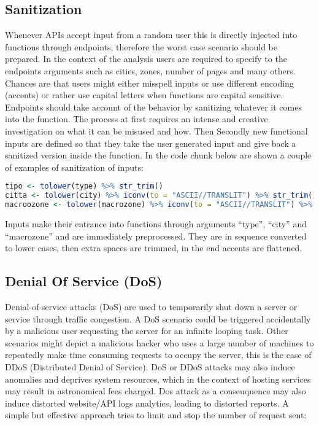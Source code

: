 \documentclass[
  12pt,
  a4paper,
  oneside]{book}
\theoremstyle{definition}
\theoremstyle{definition}
\theoremstyle{definition}
\theoremstyle{remark}
\begin{document}
\hypertarget{sanitize}{%
\subsection{Sanitization}\label{sanitize}}

Whenever APIs accept input from a random user this is directly injected into functions through endpoints, therefore the worst case scenario should be prepared. In the context of the analysis users are required to specify to the endpoints arguments such as cities, zones, number of pages and many others. Chances are that users might either misspell inputs or use different encoding (accents) or rather use capital letters when functions are capital sensitive. Endpoints should take account of the behavior by sanitizing whatever it comes into the function. The process at first requires an intense and creative investigation on what it can be misused and how. Then Secondly new functional inputs are defined so that they take the user generated input and give back a sanitized version inside the function. In the code chunk below are shown a couple of examples of sanitization of inputs:

\begin{lstlisting}[language=R]
tipo <- tolower(type) %>% str_trim()
citta <- tolower(city) %>% iconv(to = "ASCII//TRANSLIT") %>% str_trim()
macroozone <- tolower(macrozone) %>% iconv(to = "ASCII//TRANSLIT") %>% str_trim()
\end{lstlisting}

Inputs make their entrance into functions through arguments ``type'', ``city'' and ``macrozone'' and are immediately preprocessed. They are in sequence converted to lower cases, then extra spaces are trimmed, in the end accents are flattened.

\hypertarget{DoS}{%
\subsection{Denial Of Service (DoS)}\label{DoS}}

Denial-of-service attacks (DoS) are used to temporarily shut down a server or service through traffic congestion. A DoS scenario could be triggered accidentally by a malicious user requesting the server for an infinite looping task. Other scenarios might depict a malicious hacker who uses a large number of machines to repeatedly make time consuming requests to occupy the server, this is the case of DDoS (Distributed Denial of Service). DoS or DDoS attacks may also induce anomalies and deprives system resources, which in the context of hosting services may result in astronomical fees charged. Dos attack as a conseuquence may also induce distorted website/API logs analytics, leading to distorted reports.
A simple but effective approach tries to limit and stop the number of request sent:
\end{document}
